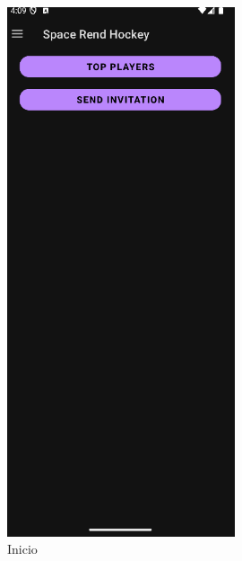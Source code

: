 \documentclass[a4paper,openright,12pt]{article}
\begin{document}
\begin{figure}[htp]
    \centering
    \begin{minipage}{0.3\textwidth}
        \centering
        \includegraphics[width=0.6\textwidth]{Images/Vista_It4_6.png} 
        \caption{Inicio}
        \label{fig:pantalla principal}
    \end{minipage}
    \hfill
    \begin{minipage}{0.3\textwidth}
        \centering

\end{minipage}
\end{figure}
\end{document}
